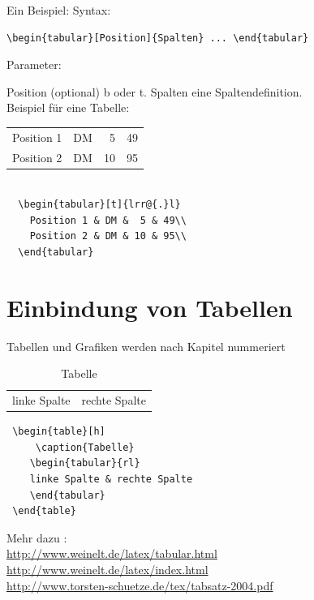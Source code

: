 \documentclass{like}
\begin{document}
Ein Beispiel:
Syntax:
\begin{verbatim}
\begin{tabular}[Position]{Spalten} ... \end{tabular}
\end{verbatim}


Parameter:

Position
    (optional) b oder t. 
Spalten
    eine Spaltendefinition.\\ 
Beispiel für eine Tabelle:
 

\begin{minipage}[t!]{0.5\textwidth}
  \begin{tabular}[t]{lrr@{.}l}
    Position 1 & DM &  5 & 49\\
    Position 2 & DM & 10 & 95\\
   \end{tabular}

\end{minipage}\hspace*{5pt}
\begin{minipage}[t!]{0.5\textwidth}

\begin{verbatim}

  \begin{tabular}[t]{lrr@{.}l}
    Position 1 & DM &  5 & 49\\
    Position 2 & DM & 10 & 95\\
  \end{tabular}
  \end{verbatim}
\end{minipage}
\section{Einbindung von Tabellen}
Tabellen und Grafiken werden nach Kapitel nummeriert
 \begin{table}[h]
 	 \caption{Tabelle}
  	\begin{tabular}{rl}
    linke Spalte & rechte Spalte
  	\end{tabular}
 \end{table}
 
 \begin{verbatim}
 \begin{table}[h]
 	 \caption{Tabelle}
  	\begin{tabular}{rl}
    linke Spalte & rechte Spalte
  	\end{tabular}
 \end{table}
 \end{verbatim}
Mehr dazu : \\
\url{http://www.weinelt.de/latex/tabular.html}\\
\url{http://www.weinelt.de/latex/index.html}\\
\url{http://www.torsten-schuetze.de/tex/tabsatz-2004.pdf}
\end{document}
